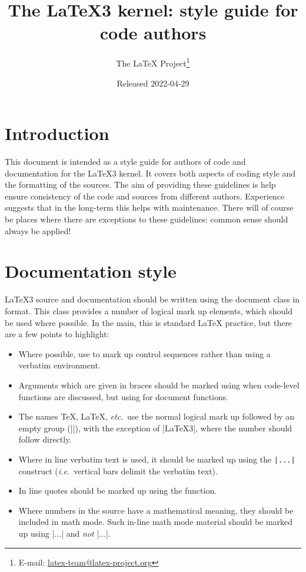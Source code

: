 \documentclass{l3doc}
\title{%
  The \LaTeX3 kernel: style guide for code authors%
}
\author{%
  The \LaTeX{} Project\thanks
    {%
      E-mail:
      \href{mailto:latex-team@latex-project.org}%
        {latex-team@latex-project.org}%
    }%
}
\date{Released 2022-04-29}
\begin{document}
\maketitle

\tableofcontents

\section{Introduction}

This document is intended as a style guide for authors of code and
documentation for the \LaTeX3 kernel. It covers both aspects of coding
style and the formatting of the sources. The aim of providing these
guidelines is help ensure consistency of the code and sources from
different authors. Experience suggests that in the long-term this helps
with maintenance. There will of course be places where there are
exceptions to these guidelines: common sense should always be
applied!

\section{Documentation style}

\LaTeX3 source and documentation should be written using the document
class  in  format. This class provides a number
of logical mark up elements, which should be used where possible.
In the main, this is standard \LaTeX{} practice, but there are a
few points to highlight:
\begin{itemize}
  \item
    Where possible, use  to mark up control sequences
    rather than using a verbatim environment.
  \item
    Arguments which are given in braces should be marked using
     when code-level functions are discussed, but using
     for document functions.
  \item
    The names \TeX{}, \LaTeX{}, \emph{etc}.\ use the normal logical mark
    up followed by an empty group (|{}|), with the exception of |\LaTeX3|,
    where the number should follow directly.
  \item
    Where in line verbatim text is used, it should be marked up
    using the \verb=|...|= construct (\emph{i.e.}~vertical bars delimit
    the verbatim text).
  \item In line quotes should be marked up using the 
    function.
  \item
    Where numbers in the source have a mathematical meaning,
    they should be included in math mode. Such in-line math mode
    material should be marked up using |$...$| and  \emph{not}
    |\(...\)|.
\end{itemize}
\end{document}
